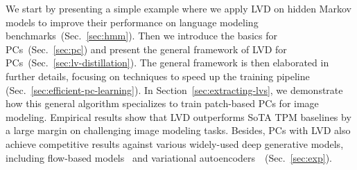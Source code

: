 \documentclass{article} %
\begin{document}
We start by presenting a simple example where we apply LVD on hidden Markov models to improve their performance on language modeling benchmarks~(Sec.~\ref{sec:hmm}). Then we introduce the basics for PCs~(Sec.~\ref{sec:pc}) and present the general framework of LVD for PCs~(Sec.~\ref{sec:lv-distillation}). The general framework is then elaborated in further details, focusing on techniques to speed up the training pipeline (Sec.~\ref{sec:efficient-pc-learning}).
In Section~\ref{sec:extracting-lvs}, we demonstrate how this general algorithm specializes to train patch-based PCs for image modeling. Empirical results show that LVD outperforms SoTA TPM baselines by a large margin on challenging image modeling tasks. Besides, PCs with LVD also achieve competitive results against various widely-used deep generative models, including flow-based models~\citep{kingma2018glow, dinh2016density} and variational autoencoders~\citep{maaloe2019biva}~(Sec.~\ref{sec:exp}).


\end{document}
